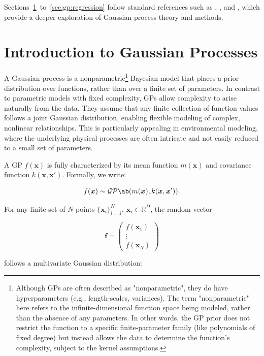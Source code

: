 Sections~\ref{sec:gp:intro}~to~\ref{sec:gp:regression} follow standard references such as \citet{rasmussen_gaussian_2006}, \citet{bishop_pattern_2006}, and \citet{mackay_introduction_1998}, which provide a deeper exploration of Gaussian process theory and methods.

\section{Introduction to Gaussian Processes}\label{sec:gp:intro}

A Gaussian process is a nonparametric\footnote{Although GPs are often described as "nonparametric", they do have hyperparameters (e.g., length-scales, variances). The term "nonparametric" here refers to the infinite-dimensional function space being modeled, rather than the absence of any parameters. In other words, the GP prior does not restrict the function to a specific finite-parameter family (like polynomials of fixed degree) but instead allows the data to determine the function's complexity, subject to the kernel assumptions.} Bayesian model that places a prior distribution over functions, rather than over a finite set of parameters. In contrast to parametric models with fixed complexity, GPs allow complexity to arise naturally from the data. They assume that any finite collection of function values follows a joint Gaussian distribution, enabling flexible modeling of complex, nonlinear relationships. This is particularly appealing in environmental modeling, where the underlying physical processes are often intricate and not easily reduced to a small set of parameters.

A GP $f(\bm{x})$ is fully characterized by its mean function $m(\bm{x})$ and covariance function $k(\bm{x}, \bm{x}')$. Formally, we write:

\begin{equation}
    f(\bm{x}) \sim \GP \ab(m(\bm{x}), k(\bm{x}, \bm{x}')).
\end{equation}

For any finite set of $N$ points $\{\bm{x}_i\}_{i=1}^N$, $\bm{x}_i \in \mathbb{R}^{D}$, the random vector

\[
\bm{f} = \begin{pmatrix} f(\bm{x}_1) \\ \vdots \\ f(\bm{x}_N) \end{pmatrix}
\]

follows a multivariate Gaussian distribution:

